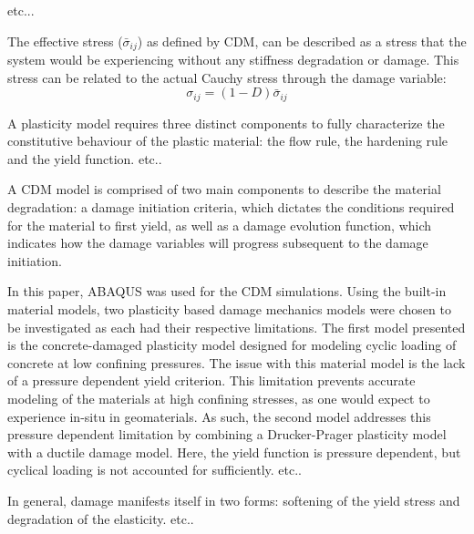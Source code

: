 etc...

The effective stress ($\bar{\sigma}_{ij}$) as defined by CDM, can be described as a stress that the system would be experiencing without any stiffness degradation or damage. This stress can be related to the actual Cauchy stress through the damage variable: 
\begin{equation}
\sigma_{ij}=\left(1-D\right)\bar{\sigma}_{ij}
\label{eqn:const7}
\end{equation}

A plasticity model requires three distinct components to fully characterize the constitutive behaviour of the plastic material: the flow rule, the hardening rule and the yield function. etc.. 

A CDM model is comprised of two main components to describe the material degradation: a damage initiation criteria, which dictates the conditions required for the material to first yield, as well as a damage evolution function, which indicates how the damage variables will progress subsequent to the damage initiation. 


In this paper, ABAQUS was used for the CDM simulations. Using the built-in material models, two plasticity based damage mechanics models were chosen to be investigated as each had their respective limitations. The first model presented is the concrete-damaged plasticity model designed for modeling cyclic loading of concrete at low confining pressures. The issue with this material model is the lack of a pressure dependent yield criterion. This limitation prevents accurate modeling of the materials at high confining stresses, as one would expect to experience in-situ in geomaterials. As such, the second model addresses this pressure dependent limitation by combining a Drucker-Prager plasticity model with a ductile damage model. Here, the yield function is pressure dependent, but cyclical loading is not accounted for sufficiently. etc..

 In general, damage manifests itself in two forms: softening of the yield stress and degradation of the elasticity. etc..

